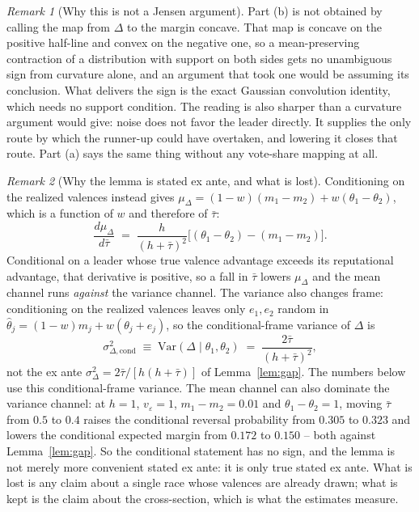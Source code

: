 \documentclass[11pt]{article}
\theoremstyle{definition}
\theoremstyle{remark}
\newtheorem*{remark}{Remark}
\begin{document}
\begin{remark}[Why this is not a Jensen argument]
Part (b) is not obtained by calling the map from $\Delta$ to the margin
concave. That map is concave on the positive half-line and convex on the
negative one, so a mean-preserving contraction of a distribution with support
on both sides gets no unambiguous sign from curvature alone, and an argument
that took one would be assuming its conclusion. What delivers the sign is the
exact Gaussian convolution identity, which needs no support condition. The
reading is also sharper than a curvature argument would give: noise does not
favor the leader directly. It supplies the only route by which the runner-up
could have overtaken, and lowering it closes that route. Part (a) says the
same thing without any vote-share mapping at all.
\end{remark}

\begin{remark}[Why the lemma is stated ex ante, and what is lost]
Conditioning on the realized valences instead gives
$\mu_\Delta = (1-w)(m_1 - m_2) + w(\theta_1 - \theta_2)$, which is a function
of $w$ and therefore of $\bar\tau$:
\[
  \frac{d\mu_\Delta}{d\bar\tau}
  \;=\; \frac{h}{(h+\bar\tau)^2}
        \bigl[(\theta_1 - \theta_2) - (m_1 - m_2)\bigr].
\]
Conditional on a leader whose true valence advantage exceeds its reputational
advantage, that derivative is positive, so a fall in $\bar\tau$ lowers
$\mu_\Delta$ and the mean channel runs \emph{against} the variance channel.
The variance also changes frame: conditioning on the realized valences leaves
only $e_1, e_2$ random in $\hat\theta_j = (1-w)m_j + w(\theta_j + e_j)$, so the
conditional-frame variance of $\Delta$ is
\[
  \sigma^2_{\Delta,\mathrm{cond}} \;\equiv\;
  \mathrm{Var}(\Delta \mid \theta_1, \theta_2)
  \;=\; \frac{2\bar\tau}{(h+\bar\tau)^2},
\]
not the ex ante $\sigma^2_\Delta = 2\bar\tau/[h(h+\bar\tau)]$ of
Lemma~\ref{lem:gap}. The numbers below use this conditional-frame variance.
The mean channel can also dominate the variance channel: at $h = 1$,
$v_\varepsilon = 1$,
$m_1 - m_2 = 0.01$ and $\theta_1 - \theta_2 = 1$, moving $\bar\tau$ from $0.5$
to $0.4$ raises the conditional reversal probability from $0.305$ to $0.323$
and lowers the conditional expected margin from $0.172$ to $0.150$ -- both
against Lemma~\ref{lem:gap}. So the conditional statement has no sign, and the
lemma is not merely more convenient stated ex ante: it is only true stated ex
ante. What is lost is any claim about a single race whose valences are already
drawn; what is kept is the claim about the cross-section, which is what the
estimates measure.
\end{remark}
\end{document}
